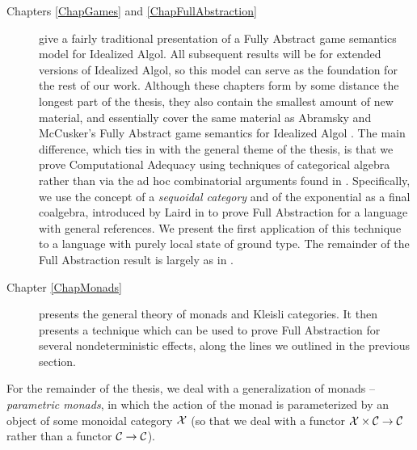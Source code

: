 \begin{description}
  \item[Chapters \ref{ChapGames} and \ref{ChapFullAbstraction}] give a fairly traditional presentation of a Fully Abstract game semantics model for Idealized Algol.  
    All subsequent results will be for extended versions of Idealized Algol, so this model can serve as the foundation for the rest of our work.  
    Although these chapters form by some distance the longest part of the thesis, they also contain the smallest amount of new material, and essentially cover the same material as Abramsky and McCusker's Fully Abstract game semantics for Idealized Algol \cite{SamsonGuyIAActive}.  
    The main difference, which ties in with the general theme of the thesis, is that we prove Computational Adequacy using techniques of categorical algebra rather than via the ad hoc combinatorial arguments found in \cite{SamsonGuyIAActive}.  
    Specifically, we use the concept of a \emph{sequoidal category} and of the exponential as a final coalgebra, introduced by Laird in \cite{laird02} to prove Full Abstraction for a language with general references.
    We present the first application of this technique to a language with purely local state of ground type.
    The remainder of the Full Abstraction result is largely as in \cite{SamsonGuyIAActive}.
  \item[Chapter \ref{ChapMonads}] presents the general theory of monads and Kleisli categories.  
    It then presents a technique which can be used to prove Full Abstraction for several nondeterministic effects, along the lines we outlined in the previous section.
\end{description}
For the remainder of the thesis, we deal with a generalization of monads -- \emph{parametric monads}, in which the action of the monad is parameterized by an object of some monoidal category $\mathcal X$ (so that we deal with a functor $\mathcal X \times {\mathcal{C}} \to {\mathcal{C}}$ rather than a functor ${\mathcal{C}} \to {\mathcal{C}}$).
